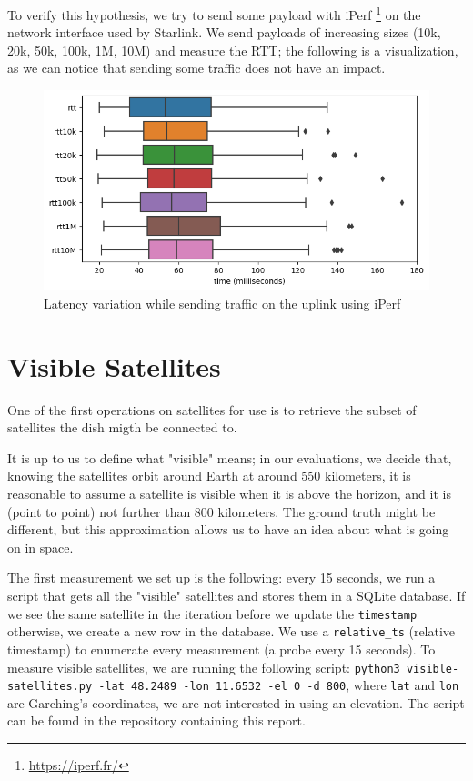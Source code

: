 \documentclass[IN,11pt,twoside,openright,idp,english]{tumthesis}
\begin{document}
To verify this hypothesis, we try to send some payload with iPerf \footnote{\url{https://iperf.fr/}} on the network interface used by Starlink. We send payloads of increasing sizes (10k, 20k, 50k, 100k, 1M, 10M) and measure the RTT; the following is a visualization, as we can notice that sending some traffic does not have an impact.

\begin{figure}
    \centering
    \includegraphics[width=0.6\columnwidth]{img/latency_iperf.png}
    \caption{Latency variation while sending traffic on the uplink using iPerf}
\end{figure}

\section{Visible Satellites}
One of the first operations on satellites for use is to retrieve the subset of satellites the dish migth be connected to.

It is up to us to define what "visible" means; in our evaluations, we decide that, knowing the satellites orbit around Earth at around 550 kilometers, it is reasonable to assume a satellite is visible when it is above the horizon, and it is (point to point) not further than 800 kilometers. The ground truth might be different, but this approximation allows us to have an idea about what is going on in space. 

The first measurement we set up is the following: every 15 seconds, we run a script that gets all the "visible" satellites and stores them in a SQLite database. If we see the same satellite in the iteration before we update the \texttt{timestamp} otherwise, we create a new row in the database. We use a \texttt{relative\_ts} (relative timestamp) to enumerate every measurement (a probe every 15 seconds). To measure visible satellites, we are running the following script: \texttt{python3 visible-satellites.py -lat 48.2489 -lon 11.6532 -el 0 -d 800}, where \texttt{lat} and \texttt{lon} are Garching's coordinates, we are not interested in using an elevation. The script can be found in the repository containing this report.
\end{document}
